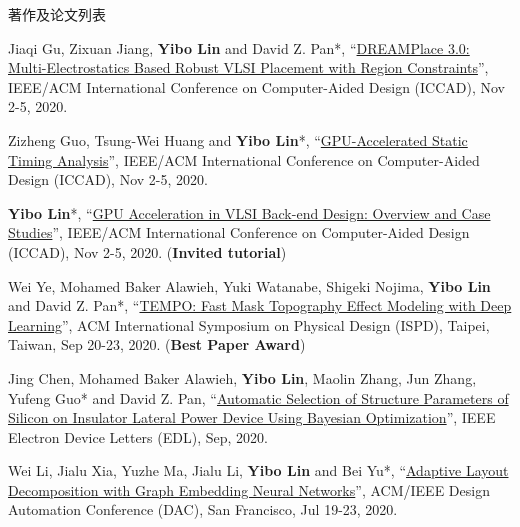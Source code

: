 \begin{rSection}{著作及论文列表}
\begin{description}[font=\normalfont, rightmargin=2em]
{}
            

\item[{[C62]}]{
        Jiaqi Gu, Zixuan Jiang, \textbf{Yibo Lin} and David Z. Pan*, 
    ``\href{https://doi.org/10.1145/3400302.3415691}{DREAMPlace 3.0: Multi-Electrostatics Based Robust VLSI Placement with Region Constraints}'', 
    IEEE/ACM International Conference on Computer-Aided Design (ICCAD), Nov 2-5, 2020.
    
}
            

\item[{[C61]}]{
        Zizheng Guo, Tsung-Wei Huang and \textbf{Yibo Lin}*, 
    ``\href{https://doi.org/10.1145/3400302.3415631}{GPU-Accelerated Static Timing Analysis}'', 
    IEEE/ACM International Conference on Computer-Aided Design (ICCAD), Nov 2-5, 2020.
    
}
            

\item[{[C60]}]{
        \textbf{Yibo Lin}*, 
    ``\href{https://doi.org/10.1145/3400302.3415765}{GPU Acceleration in VLSI Back-end Design: Overview and Case Studies}'', 
    IEEE/ACM International Conference on Computer-Aided Design (ICCAD), Nov 2-5, 2020.
    (\textbf{Invited tutorial})
}
            

\item[{[C59]}]{
        Wei Ye, Mohamed Baker Alawieh, Yuki Watanabe, Shigeki Nojima, \textbf{Yibo Lin} and David Z. Pan*, 
    ``\href{https://doi.org/10.1145/3372780.3375565}{TEMPO: Fast Mask Topography Effect Modeling with Deep Learning}'', 
    ACM International Symposium on Physical Design (ISPD), Taipei, Taiwan, Sep 20-23, 2020.
    (\textbf{Best Paper Award})
}
            

\item[{[J58]}]{
        Jing Chen, Mohamed Baker Alawieh, \textbf{Yibo Lin}, Maolin Zhang, Jun Zhang, Yufeng Guo* and David Z. Pan, 
    ``\href{https://doi.org/10.1109/LED.2020.3013571}{Automatic Selection of Structure Parameters of Silicon on Insulator Lateral Power Device Using Bayesian Optimization}'', 
    IEEE Electron Device Letters (EDL), Sep, 2020.
    
}
            

\item[{[C57]}]{
        Wei Li, Jialu Xia, Yuzhe Ma, Jialu Li, \textbf{Yibo Lin} and Bei Yu*, 
    ``\href{https://doi.org/10.1109/DAC18072.2020.9218706}{Adaptive Layout Decomposition with Graph Embedding Neural Networks}'', 
    ACM/IEEE Design Automation Conference (DAC), San Francisco, Jul 19-23, 2020.
    
}
\end{description}
\end{rSection}

